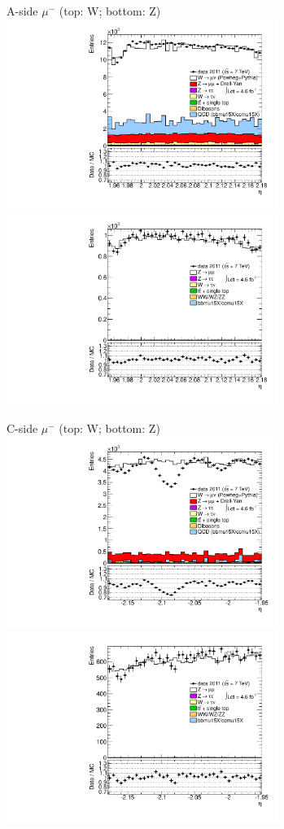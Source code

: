 {{
A-side $\mu^{-}$ (top: W; bottom: Z)
\centering
\includegraphics[width=0.66\textwidth]{dates/20130306/figures/etaphi/Wnometmt_10_A_stack_l_eta_NEG} \\
\includegraphics[width=0.66\textwidth]{dates/20130306/figures/etaphi/Z_10_A_stack_lN_eta_ALL.pdf} 

\cole
}


 {
\colb[T]

C-side $\mu^{-}$ (top: W; bottom: Z)
\centering
\includegraphics[width=0.66\textwidth]{dates/20130306/figures/etaphi/Wpt35_10_C_stack_l_eta_NEG} \\
\includegraphics[width=0.66\textwidth]{dates/20130306/figures/etaphi/Zpt35_10_C_stack_lN_eta_ALL.pdf}

}}
